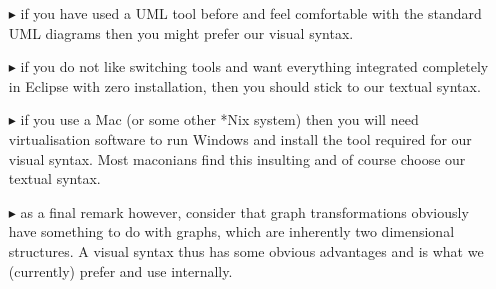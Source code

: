 \begin{itemize}

\item[$\blacktriangleright$] if you have used a UML tool before and feel comfortable with the standard UML diagrams then you might prefer our visual syntax.

\item[$\blacktriangleright$] if you do not like switching tools and want everything integrated completely in Eclipse with zero installation, then you should stick to our textual syntax.

\item[$\blacktriangleright$] if you use a Mac (or some other *Nix system) then you will need virtualisation software to run Windows and install the tool required for our visual syntax. 
Most maconians find this insulting and of course choose our textual syntax.

\item[$\blacktriangleright$]as a final remark however, consider that graph transformations obviously have something to do with graphs, which are inherently two dimensional structures. 
A visual syntax thus has some obvious advantages and is what we (currently) prefer and use internally.

\end{itemize}


